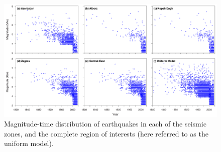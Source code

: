 \begin{figure} [t]
	\centering
	\includegraphics[width=\textwidth]{figures/pdf/figure-04}
	\caption{Magnitude-time distribution of earthquakes in each of the seismic zones, and the complete region of interests (here referred to as the uniform model).}
	\label{fig:scatter}
\end{figure}
